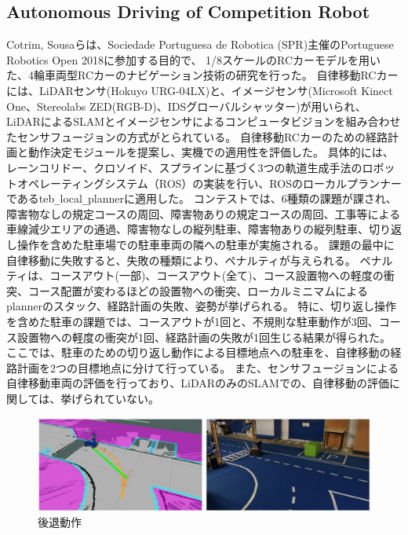 \subsection{Autonomous Driving of Competition Robot}
Cotrim, Sousaら\cite{auto:comp}は、Sociedade Portuguesa de Robotica (SPR)主催のPortuguese Robotics Open 2018に参加する目的で、
1/8スケールのRCカーモデルを用いた、4輪車両型RCカーのナビゲーション技術の研究を行った。
自律移動RCカーには、LiDARセンサ(Hokuyo URG-04LX)と、イメージセンサ(Microsoft Kinect One、Stereolabs ZED(RGB-D)、IDSグローバルシャッター)が用いられ、
LiDARによるSLAMとイメージセンサによるコンピュータビジョンを組み合わせたセンサフュージョンの方式がとられている。
自律移動RCカーのための経路計画と動作決定モジュールを提案し、実機での適用性を評価した。
具体的には、レーンコリドー、クロソイド、スプラインに基づく3つの軌道生成手法のロボットオペレーティングシステム（ROS）の実装を行い、ROSのローカルプランナーであるteb\verb|_|local\verb|_|plannerに適用した。
コンテストでは、6種類の課題が課され、障害物なしの規定コースの周回、障害物ありの規定コースの周回、工事等による車線減少エリアの通過、障害物なしの縦列駐車、障害物ありの縦列駐車、切り返し操作を含めた駐車場での駐車車両の隣への駐車が実施される。
課題の最中に自律移動に失敗すると、失敗の種類により、ペナルティが与えられる。
ペナルティは、コースアウト(一部)、コースアウト(全て)、コース設置物への軽度の衝突、コース配置が変わるほどの設置物への衝突、ローカルミニマムによるplannerのスタック、経路計画の失敗、姿勢が挙げられる。
特に、切り返し操作を含めた駐車の課題では、コースアウトが1回と、不規則な駐車動作が3回、コース設置物への軽度の衝突が1回、経路計画の失敗が1回生じる結果が得られた。
ここでは、駐車のための切り返し動作による目標地点への駐車を、自律移動の経路計画を2つの目標地点に分けて行っている。
また、センサフュージョンによる自律移動車両の評価を行っており、LiDARのみのSLAMでの、自律移動の評価に関しては、挙げられていない。

\begin{figure}[h]
  \begin{center}
  \includegraphics[width=.8\linewidth]{img/auto_1.jpg}
  \caption{後退動作}
  \label{auto:comp:koutai}
  \end{center}
\end{figure}

